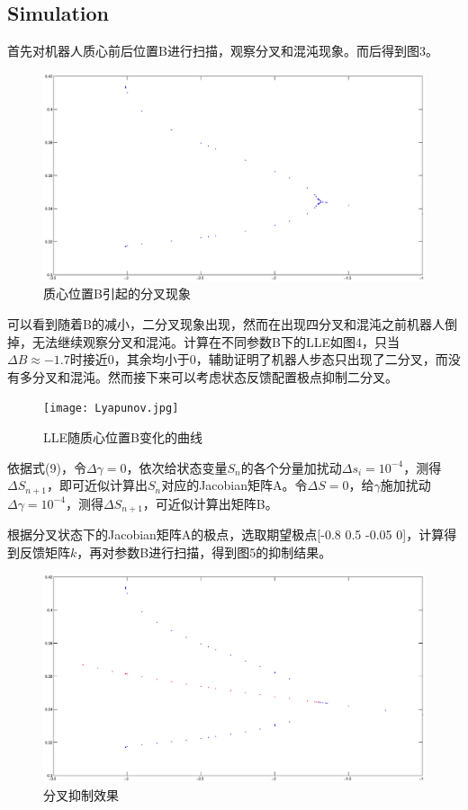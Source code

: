 \documentclass[UTF8]{ctexart}
\begin{document}
\subsection{Simulation}
首先对机器人质心前后位置B进行扫描，观察分叉和混沌现象。而后得到图3。\par
\begin{figure}[htbp]
\centerline{\includegraphics[width=\textwidth]{Bifurcation.eps}}
\caption[]{质心位置B引起的分叉现象}
\end{figure}
\par
可以看到随着B的减小，二分叉现象出现，然而在出现四分叉和混沌之前机器人倒掉，无法继续观察分叉和混沌。计算在不同参数B下的LLE如图4，只当$\Delta B\approx -1.7$时接近0，其余均小于0，辅助证明了机器人步态只出现了二分叉，而没有多分叉和混沌。然而接下来可以考虑状态反馈配置极点抑制二分叉。\par
\begin{figure}[htbp]
\centerline{\texttt{[image: Lyapunov.jpg]}}
\caption[]{LLE随质心位置B变化的曲线}
\end{figure}
依据式(9)，令$\Delta\gamma=0$，依次给状态变量$S_{n}$的各个分量加扰动$\Delta s_{i}=10^{-4}$，测得$\Delta S_{n+1}$，即可近似计算出$S_{n}$对应的Jacobian矩阵A。令$\Delta S=0$，给$\gamma$施加扰动$\Delta\gamma=10^{-4}$，测得$\Delta S_{n+1}$，可近似计算出矩阵B。\par
根据分叉状态下的Jacobian矩阵A的极点，选取期望极点[-0.8 0.5 -0.05 0]，计算得到反馈矩阵$k$，再对参数B进行扫描，得到图5的抑制结果。\par
\begin{figure}[htbp]
\centerline{\includegraphics[width=\textwidth]{bifur&depr.eps}}
\caption[]{分叉抑制效果}
\end{figure}
\end{document}
